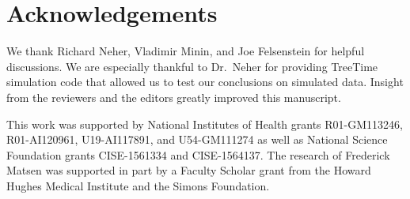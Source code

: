 \documentclass[11pt]{article}
\newcommand{\beginsupplement}{%
        \setcounter{table}{0}
        \renewcommand{\thetable}{S\arabic{table}}%
        \setcounter{figure}{0}
        \renewcommand{\thefigure}{S\arabic{figure}}%
     }
\begin{document}
\section*{Acknowledgements}
We thank Richard Neher, Vladimir Minin, and Joe Felsenstein for helpful discussions.
We are especially thankful to Dr.\ Neher for providing TreeTime simulation code that allowed us to test our conclusions on simulated data.
Insight from the reviewers and the editors greatly improved this manuscript.

This work was supported by National Institutes of Health grants R01-GM113246, R01-AI120961, U19-AI117891, and U54-GM111274 as well as National Science Foundation grants CISE-1561334 and CISE-1564137.
The research of Frederick Matsen was supported in part by a Faculty Scholar grant from the Howard Hughes Medical Institute and the Simons Foundation.




\newpage
\beginsupplement


\end{document}
